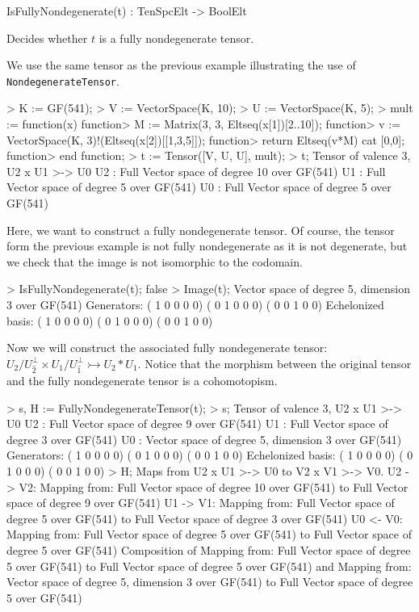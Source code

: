 \begin{intrinsics}
IsFullyNondegenerate(t) : TenSpcElt -> BoolElt
\end{intrinsics}

Decides whether $t$ is a fully nondegenerate tensor.

\begin{example}[FullyNondegenerate]

We use the same tensor as the previous example illustrating the use of \texttt{NondegenerateTensor}.
\begin{code}
> K := GF(541);
> V := VectorSpace(K, 10);
> U := VectorSpace(K, 5);
> mult := function(x)
function>   M := Matrix(3, 3, Eltseq(x[1])[2..10]);
function>   v := VectorSpace(K, 3)!(Eltseq(x[2])[[1,3,5]]);
function>   return Eltseq(v*M) cat [0,0];
function> end function;
> t := Tensor([V, U, U], mult);
> t;
Tensor of valence 3, U2 x U1 >-> U0
U2 : Full Vector space of degree 10 over GF(541)
U1 : Full Vector space of degree 5 over GF(541)
U0 : Full Vector space of degree 5 over GF(541)
\end{code}

Here, we want to construct a fully nondegenerate tensor. Of course, the tensor
form the previous example is not fully nondegenerate as it is not degenerate,
but we check that the image is not isomorphic to the codomain.
\begin{code}
> IsFullyNondegenerate(t);
false
> Image(t);
Vector space of degree 5, dimension 3 over GF(541)
Generators:
(  1   0   0   0   0)
(  0   1   0   0   0)
(  0   0   1   0   0)
Echelonized basis:
(  1   0   0   0   0)
(  0   1   0   0   0)
(  0   0   1   0   0)
\end{code}

Now we will construct the associated fully nondegenerate tensor:
$U_2/U_{\widehat{2}}^\perp\times U_1/U_{\widehat{1}}^\perp\rightarrowtail
U_2*U_1$. Notice that the morphism between the original tensor and the fully
nondegenerate tensor is a cohomotopism.
\begin{code}
> s, H := FullyNondegenerateTensor(t);
> s;
Tensor of valence 3, U2 x U1 >-> U0
U2 : Full Vector space of degree 9 over GF(541)
U1 : Full Vector space of degree 3 over GF(541)
U0 : Vector space of degree 5, dimension 3 over GF(541)
Generators:
(  1   0   0   0   0)
(  0   1   0   0   0)
(  0   0   1   0   0)
Echelonized basis:
(  1   0   0   0   0)
(  0   1   0   0   0)
(  0   0   1   0   0)
> H;
Maps from U2 x U1 >-> U0 to V2 x V1 >-> V0.
U2 -> V2: Mapping from: Full Vector space of degree 10 over GF(541) to
Full Vector space of degree 9 over GF(541)
U1 -> V1: Mapping from: Full Vector space of degree 5 over GF(541) to
Full Vector space of degree 3 over GF(541)
U0 <- V0: Mapping from: Full Vector space of degree 5 over GF(541) to
Full Vector space of degree 5 over GF(541)
Composition of Mapping from: Full Vector space of degree 5 over GF(541)
to Full Vector space of degree 5 over GF(541) and
Mapping from: Vector space of degree 5, dimension 3 over GF(541) to Full
Vector space of degree 5 over GF(541)
\end{code}
\end{example}

